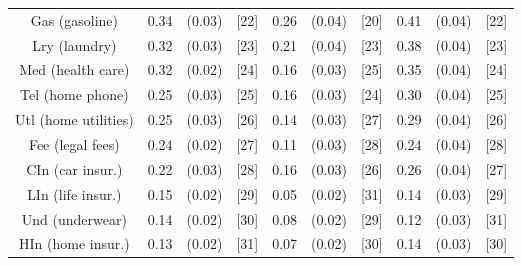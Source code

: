 \documentclass[a4paper,10pt]{article}
\begin{document}
\begin{tabular}{cccccccccc}
Gas (gasoline)&0.34&(0.03)&[22] & 0.26&(0.04)&[20] & 0.41 & (0.04) & [22] \\
Lry (laundry)&0.32&(0.03)&[23] & 0.21&(0.04)&[23] & 0.38 & (0.04) & [23] \\
Med (health care)&0.32&(0.02)&[24] & 0.16&(0.03)&[25] & 0.35 & (0.04) & [24] \\
Tel (home phone)&0.25&(0.03)&[25] & 0.16&(0.03)&[24] & 0.30 & (0.04) & [25] \\
Utl (home utilities)&0.25&(0.03)&[26] & 0.14&(0.03)&[27] & 0.29 & (0.04) & [26]\\
Fee (legal fees)&0.24&(0.02)&[27] & 0.11&(0.03)&[28] & 0.24 & (0.04) & [28] \\
CIn (car insur.)&0.22&(0.03)&[28] & 0.16&(0.03)&[26] & 0.26 & (0.04) & [27] \\
LIn (life insur.)&0.15&(0.02)&[29] & 0.05&(0.02)&[31] & 0.14 & (0.03) & [29] \\
Und (underwear)&0.14&(0.02)&[30] & 0.08&(0.02)&[29] & 0.12 & (0.03) & [31] \\
HIn (home insur.)&0.13&(0.02)&[31] & 0.07&(0.02)&[30] & 0.14 & (0.03) & [30] \\
\hline \hline
\end{tabular}
\end{document}
